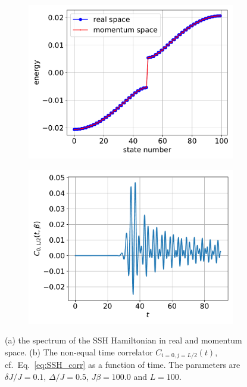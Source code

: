 \documentclass{SciPost}
\newcommand\0{\scalebox{-1}[1]{0}}
\begin{document}
\begin{figure}[t!]
	\centering
	\begin{subfigure}[b]{0.496\textwidth}
		\includegraphics[width=\textwidth]{SSH_spectrum.pdf}
	\end{subfigure}
	\begin{subfigure}[b]{0.496\textwidth}
		\includegraphics[width=\textwidth]{SSH_correlator.pdf}
	\end{subfigure}
	\caption{\label{fig:SSH} (a) the spectrum of the SSH Hamiltonian in real and momentum space. (b) The non-equal time correlator $C_{i=0,j=L/2}(t)$, cf.~Eq.~\eqref{eq:SSH_corr} as a function of time. The parameters are $\delta J/J=0.1$, $\Delta/J=0.5$, $J\beta=100.0$ and $L=100$.}  
\end{figure} 
\end{document}
